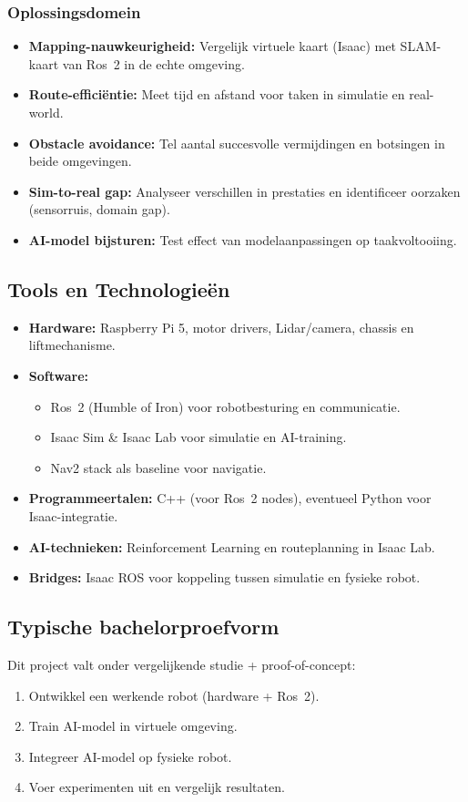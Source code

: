 \subsubsection{Oplossingsdomein}
\begin{itemize}
    \item \textbf{Mapping-nauwkeurigheid:} Vergelijk virtuele kaart (Isaac) met SLAM-kaart van Ros~2 in de echte omgeving.
    \item \textbf{Route-efficiëntie:} Meet tijd en afstand voor taken in simulatie en real-world.
    \item \textbf{Obstacle avoidance:} Tel aantal succesvolle vermijdingen en botsingen in beide omgevingen.
    \item \textbf{Sim-to-real gap:} Analyseer verschillen in prestaties en identificeer oorzaken (sensorruis, domain gap).
    \item \textbf{AI-model bijsturen:} Test effect van modelaanpassingen op taakvoltooiing.
\end{itemize}

\subsection{Tools en Technologieën}
\begin{itemize}
    \item \textbf{Hardware:} Raspberry Pi 5, motor drivers, Lidar/camera, chassis en liftmechanisme.
    \item \textbf{Software:}
    \begin{itemize}
        \item Ros~2 (Humble of Iron) voor robotbesturing en communicatie.
        \item Isaac Sim \& Isaac Lab voor simulatie en AI-training.
        \item Nav2 stack als baseline voor navigatie.
    \end{itemize}
    \item \textbf{Programmeertalen:} C++ (voor Ros~2 nodes), eventueel Python voor Isaac-integratie.
    \item \textbf{AI-technieken:} Reinforcement Learning en routeplanning in Isaac Lab.
    \item \textbf{Bridges:} Isaac ROS voor koppeling tussen simulatie en fysieke robot.
\end{itemize}

\subsection{Typische bachelorproefvorm}
Dit project valt onder vergelijkende studie + proof-of-concept:
\begin{enumerate}
    \item Ontwikkel een werkende robot (hardware + Ros~2).
    \item Train AI-model in virtuele omgeving.
    \item Integreer AI-model op fysieke robot.
    \item Voer experimenten uit en vergelijk resultaten.
\end{enumerate}

